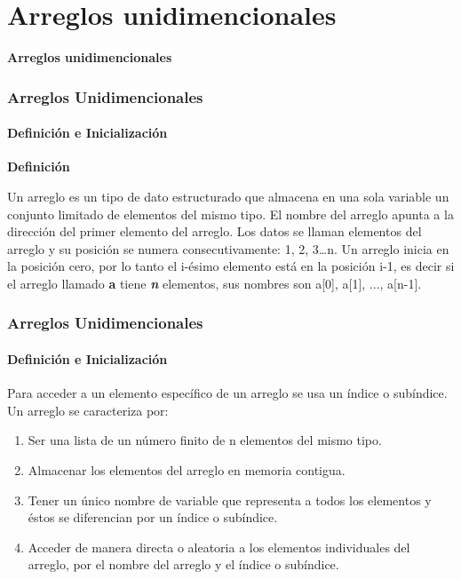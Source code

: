 \section*{Arreglos unidimencionales}

\begin{frame}[c] 
\centering
\huge \textbf{Arreglos unidimencionales}
\end{frame}

\begin{frame}
    \frametitle{Arreglos Unidimencionales}
    \framesubtitle{Definición e Inicialización}
    \begin{center}
        \textbf{Definición}
    \end{center}
    \justify
    \hspace{5mm}Un arreglo es un tipo de dato estructurado que almacena en una sola variable un conjunto limitado de elementos del mismo tipo. El nombre del arreglo apunta a la dirección del primer elemento del arreglo. Los datos se llaman elementos del arreglo y su posición se numera consecutivamente: 1, 2, 3…n. Un arreglo inicia en la posición cero, por lo tanto el i-ésimo elemento está en la posición i-1, es decir si el arreglo llamado \textbf{a} tiene \textbf{\textit{n}} elementos, sus nombres son a[0], a[1], ..., a[n-1].\\
\end{frame}


\begin{frame}
\frametitle{Arreglos Unidimencionales}
\framesubtitle{Definición e Inicialización}
    \justify
    Para acceder a un elemento específico de un arreglo se usa un índice o subíndice.
    Un arreglo se caracteriza por:
    \begin{enumerate}
        \item Ser una lista de un número finito de n elementos del mismo tipo.
        \item Almacenar los elementos del arreglo en memoria contigua.
        \item Tener un único nombre de variable que representa a todos los elementos y éstos se diferencian por un índice o subíndice.
        \item Acceder de manera directa o aleatoria a los elementos individuales del arreglo, por el nombre del arreglo y el índice o subíndice.
    \end{enumerate}
\end{frame}


